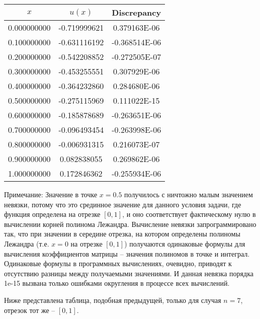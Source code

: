 \documentclass[12pt,a4paper]{article}
\begin{document}
\begin{center} 
\begin{tabular}{|c|c|c|}
\hline
         $x$      &      $u(x)$    &  Discrepancy  \\
\hline
    0.000000000 & -0.719999621 &  0.379163E-06 \\
\hline    
    0.100000000 & -0.631116192 & -0.368514E-06 \\
\hline    
    0.200000000 & -0.542208852 & -0.272505E-07 \\
\hline    
    0.300000000 & -0.453255551 &  0.307929E-06 \\
\hline    
    0.400000000 & -0.364232860 &  0.284680E-06 \\
\hline    
    0.500000000 & -0.275115969 &  0.111022E-15 \\
\hline    
    0.600000000 & -0.185878689 & -0.263651E-06 \\
\hline    
    0.700000000 & -0.096493454 & -0.263998E-06 \\
\hline    
    0.800000000 & -0.006931315 &  0.216073E-07 \\
\hline    
    0.900000000 &  0.082838055 &  0.269862E-06 \\
\hline    
    1.000000000 &  0.172846362 & -0.255934E-06 \\
\hline    

\end{tabular}
\end{center}

Примечание: Значение в точке $x=0.5$ получилось с ничтожно малым значением невязки, потому что это срединное значение для данного условия задачи, где функция определена на отрезке $[0,1]$, и оно соответствует фактическому нулю в вычислении корней полинома Лежандра. Вычисление невязки запрограммировано так, что при значении в середине отрезка, на котором определены полиномы Лежандра (т.е. $x=0$ на отрезке $[0,1]$) получаются одинаковые формулы для вычисления коэффициентов матрицы -- значения полиномов в точке и интеграл. Одинаковые формулы в программных вычислениях, очевидно, приводят к отсутствию разницы между получаемыми значениями. И данная невязка порядка 1e-15 вызвана только ошибками округления в процессе всех вычислений.

Ниже представлена таблица, подобная предыдущей, только для случая $n=7$, отрезок тот же -- $[0,1]$.
\end{document}
